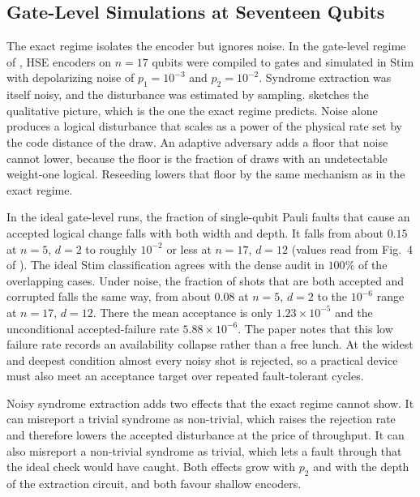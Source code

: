 \subsection{Gate-Level Simulations at Seventeen Qubits}\label{sec:qec:results17}

The exact regime isolates the encoder but ignores noise. In the gate-level regime of \cite{guo2026qecaudit}, HSE encoders on $n=17$ qubits were compiled to gates and simulated in Stim with depolarizing noise of $p_1=10^{-3}$ and $p_2=10^{-2}$. Syndrome extraction was itself noisy, and the disturbance was estimated by sampling.  sketches the qualitative picture, which is the one the exact regime predicts. Noise alone produces a logical disturbance that scales as a power of the physical rate set by the code distance of the draw. An adaptive adversary adds a floor that noise cannot lower, because the floor is the fraction of draws with an undetectable weight-one logical. Reseeding lowers that floor by the same mechanism as in the exact regime.

In the ideal gate-level runs, the fraction of single-qubit Pauli faults that cause an accepted logical change falls with both width and depth. It falls from about $0.15$ at $n=5$, $d=2$ to roughly $10^{-2}$ or less at $n=17$, $d=12$ (values read from Fig.~4 of \cite{guo2026qecaudit}). The ideal Stim classification agrees with the dense audit in $100\%$ of the overlapping cases. Under noise, the fraction of shots that are both accepted and corrupted falls the same way, from about $0.08$ at $n=5$, $d=2$ to the $10^{-6}$ range at $n=17$, $d=12$. There the mean acceptance is only $1.23\times10^{-5}$ and the unconditional accepted-failure rate $5.88\times10^{-6}$. The paper notes that this low failure rate records an availability collapse rather than a free lunch. At the widest and deepest condition almost every noisy shot is rejected, so a practical device must also meet an acceptance target over repeated fault-tolerant cycles.

Noisy syndrome extraction adds two effects that the exact regime cannot show. It can misreport a trivial syndrome as non-trivial, which raises the rejection rate and therefore lowers the accepted disturbance at the price of throughput. It can also misreport a non-trivial syndrome as trivial, which lets a fault through that the ideal check would have caught. Both effects grow with $p_2$ and with the depth of the extraction circuit, and both favour shallow encoders.

